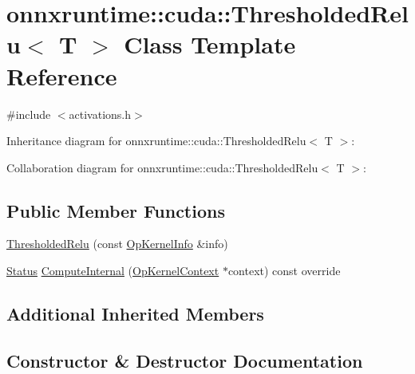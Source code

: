 \hypertarget{classonnxruntime_1_1cuda_1_1ThresholdedRelu}{}\section{onnxruntime\+:\+:cuda\+:\+:Thresholded\+Relu$<$ T $>$ Class Template Reference}
\label{classonnxruntime_1_1cuda_1_1ThresholdedRelu}


{\ttfamily \#include $<$activations.\+h$>$}



Inheritance diagram for onnxruntime\+:\+:cuda\+:\+:Thresholded\+Relu$<$ T $>$\+:


Collaboration diagram for onnxruntime\+:\+:cuda\+:\+:Thresholded\+Relu$<$ T $>$\+:
\subsection*{Public Member Functions}
\begin{DoxyCompactItemize}
\item 
\mbox{\hyperlink{classonnxruntime_1_1cuda_1_1ThresholdedRelu_ab702fbd7dc0adf6010e152d1a8b4cd60}{Thresholded\+Relu}} (const \mbox{\hyperlink{classonnxruntime_1_1OpKernelInfo}{Op\+Kernel\+Info}} \&info)
\item 
\mbox{\hyperlink{classonnxruntime_1_1common_1_1Status}{Status}} \mbox{\hyperlink{classonnxruntime_1_1cuda_1_1ThresholdedRelu_a867604561536f8e8b095b2ab5f676ba8}{Compute\+Internal}} (\mbox{\hyperlink{classonnxruntime_1_1OpKernelContext}{Op\+Kernel\+Context}} $\ast$context) const override
\end{DoxyCompactItemize}
\subsection*{Additional Inherited Members}


\subsection{Constructor \& Destructor Documentation}
\mbox{\label{classonnxruntime_1_1cuda_1_1ThresholdedRelu_ab702fbd7dc0adf6010e152d1a8b4cd60}} 
